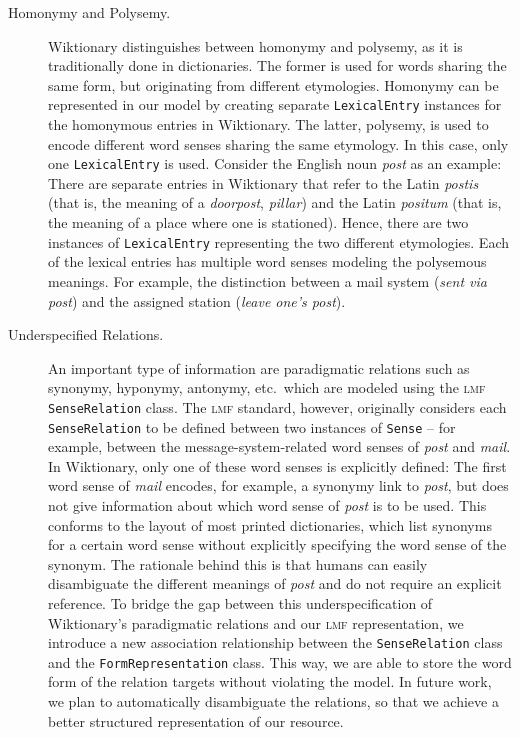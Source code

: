 \documentclass[output=paper]{LSP/langsci}
\begin{document}
\begin{description}\sloppy
\item[Homonymy and Polysemy.]
Wiktionary distinguishes between homonymy and polysemy, as it is traditionally done in dictionaries. The former is used for words sharing the same form, but originating from different etymologies. Homonymy can be represented in our model by creating separate \texttt{LexicalEntry} instances for the homonymous entries in Wiktionary. The latter, polysemy, is used to encode different word senses sharing the same etymology. In this case, only one \texttt{LexicalEntry} is used. Consider the English noun \textit{post} as an example: There are separate entries in Wiktionary that refer to the Latin \textit{postis} (that is, the meaning of a \textit{doorpost}, \textit{pillar}) and the Latin \textit{positum} (that is, the meaning of a place where one is stationed). Hence, there are two instances of \texttt{LexicalEntry} representing the two different etymologies. Each of the lexical entries has multiple word senses modeling the polysemous meanings. For example, the distinction between a mail system (\textit{sent via post}) and the assigned station (\textit{leave one's post}).

\item[Underspecified Relations.]
An important type of information are paradigmatic relations such as synonymy, hyponymy, antonymy, etc.\ which are modeled using the \textsc{lmf} \texttt{SenseRelation} class. The \textsc{lmf} standard, however, originally considers each \texttt{Sense\-Relation} to be defined between two instances of \texttt{Sense} -- for example, between the message-system-related word senses of \textit{post} and \textit{mail}. In Wiktionary, only one of these word senses is explicitly defined: The first word sense of \textit{mail} encodes, for example, a synonymy link to \textit{post}, but does not give information about which word sense of \textit{post} is to be used. This conforms to the layout of most printed dictionaries, which list synonyms for a certain word sense without explicitly specifying the word sense of the synonym. The rationale behind this is that humans can easily disambiguate the different meanings of \textit{post} and do not require an explicit reference. To bridge the gap between this underspecification of Wiktionary's 
paradigmatic relations and our \textsc{lmf} representation, we introduce a new association relationship between the \texttt{SenseRelation} class and the \texttt{FormRepresentation} class. This way, we are able to store the word form of the relation targets without violating the model. In future work, we plan to automatically disambiguate the relations, so that we achieve a better structured representation of our resource.
\end{description}
\end{document}
